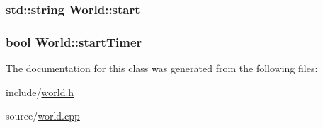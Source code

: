 \subsubsection[{\texorpdfstring{start}{start}}]{\setlength{\rightskip}{0pt plus 5cm}std\+::string World\+::start\hspace{0.3cm}{\ttfamily [private]}}\hypertarget{class_world_a931da4fdd320f91a2907d3ec740aa071}{}\label{class_world_a931da4fdd320f91a2907d3ec740aa071}
\subsubsection[{\texorpdfstring{start\+Timer}{startTimer}}]{\setlength{\rightskip}{0pt plus 5cm}bool World\+::start\+Timer}\hypertarget{class_world_a7270b9f8836a03add50bffdf20d9d199}{}\label{class_world_a7270b9f8836a03add50bffdf20d9d199}


The documentation for this class was generated from the following files\+:\begin{DoxyCompactItemize}
\item 
include/\hyperlink{world_8h}{world.\+h}\item 
source/\hyperlink{world_8cpp}{world.\+cpp}\end{DoxyCompactItemize}
